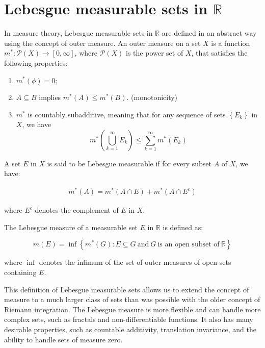\documentclass[12pt, a4paper]{article} %
\begin{document}
    
    \section{Lebesgue measurable sets in $\mathbb{R}$}   

        In measure theory, Lebesgue measurable sets in $\mathbb{R}$ are defined in an abstract way using the concept of outer measure. An outer measure on a set $X$ is a function $m^*: \mathcal{P}(X) \to [0,\infty]$, where $\mathcal{P}(X)$ is the power set of $X$, that satisfies the following properties:

       \begin{enumerate}
        \item $m^*(\phi) = 0$;
        \item $A \subseteq B$ implies $m^*(A) \leq m^*(B)$. (monotonicity)
        \item $m^*$ is countably subadditive, meaning that for any sequence of sets $\left\{E_k\right\}$ in $X$, we have \[m^*\left(\bigcup_{k=1}^{\infty} E_k\right) \leq \sum_{k=1}^{\infty}m^*(E_k)\]
       \end{enumerate}


        A set $E$ in $X$ is said to be Lebesgue measurable if for every subset $A$ of $X$, we have:

        \begin{align*}
            \boxed{m^*(A) = m^*(A \cap  E) + m^*(A \cap E^c)}
        \end{align*}

        where $E^c$ denotes the complement of $E$ in $X$.

        The Lebesgue measure of a measurable set $E$ in $\mathbb{R}$ is defined as:

        \[m(E) = \inf \left\{ m^*(G) : E \subseteq G\  \mbox{and}\ G \ \mbox{is an open subset of}\  \mathbb{R} \right\}\]
        
        where $\inf$ denotes the infimum of the set of outer measures of open sets containing $E$.
        
        This definition of Lebesgue measurable sets allows us to extend the concept of measure to a much larger class of sets than was possible with the older concept of Riemann integration. The Lebesgue measure is more flexible and can handle more complex sets, such as fractals and non-differentiable functions. It also has many desirable properties, such as countable additivity, translation invariance, and the ability to handle sets of measure zero.
\end{document}
